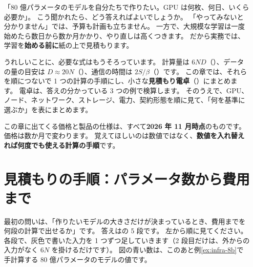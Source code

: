 「80 億パラメータのモデルを自分たちで作りたい。GPU は何枚、何日、いくら必要か」。
こう聞かれたら、どう答えればよいでしょうか。
「やってみないと分かりません」では、予算も計画も立ちません。
一方で、大規模な学習は一度始めたら数日から数か月かかり、やり直しは高くつきます。
だから実務では、学習を\textbf{始める前に}紙の上で見積もります。

うれしいことに、必要な式はもうそろっています。
計算量は $6ND$（）、データの量の目安は $D\approx 20N$（）、通信の時間は $2S/\beta$（）です。
この章では、それらを順につないで 1 つの計算の手順にし、小さな\textbf{見積もり電卓}（）にまとめます。
電卓は、答えの分かっている 3 つの例で検算します。
そのうえで、GPU、ノード、ネットワーク、ストレージ、電力、契約形態を順に見て、「何を基準に選ぶか」を表にまとめます。

この章に出てくる価格と製品の仕様は、すべて\textbf{2026 年 11 月時点}のものです。
価格は数か月で変わります。
覚えてほしいのは数値ではなく、\textbf{数値を入れ替えれば何度でも使える計算の手順}です。

\section{見積もりの手順：パラメータ数から費用まで}\label{sec:infra-pipeline}

最初の問いは、「作りたいモデルの大きさだけが決まっているとき、費用までを何段の計算で出せるか」です。
答えはの 5 段です。
左から順に見てください。
各段で、灰色で書いた入力を 1 つずつ足していきます（2 段目だけは、外からの入力がなく $6N$ を掛けるだけです）。
図の青い数は、このあと例\ref{ex:infra-8b}で手計算する 80 億パラメータのモデルの値です。

